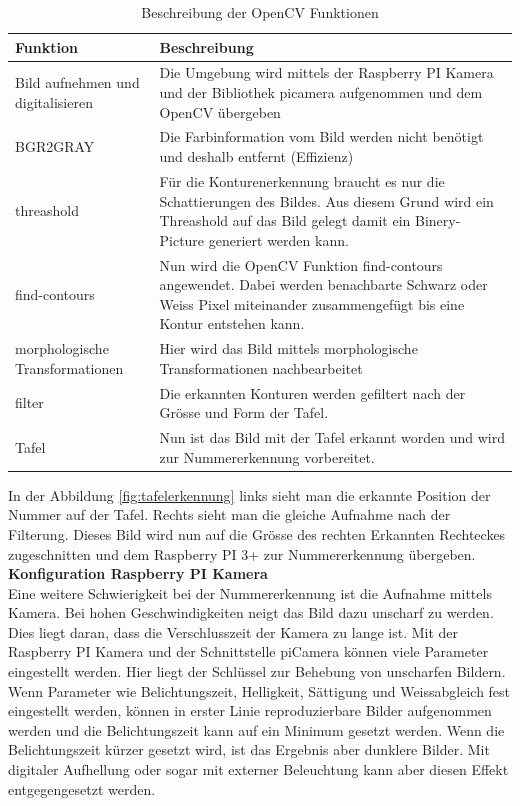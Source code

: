 \documentclass[../../main.tex]{subfiles}
\begin{document}
    \begin{table}[H]
        \begin{flushleft}
            \begin{tabular}{ | p{3cm} | p{10.5cm} |}
                \hline
                \textbf{Funktion}  & \textbf{Beschreibung} \\\hline
                Bild aufnehmen und digitalisieren & Die Umgebung wird mittels der Raspberry PI Kamera und der Bibliothek picamera aufgenommen und dem OpenCV übergeben \\\hline
                BGR2GRAY & Die Farbinformation vom Bild werden nicht benötigt und deshalb entfernt (Effizienz) \\ \hline
                threashold & Für die Konturenerkennung braucht es nur die Schattierungen des Bildes. Aus diesem Grund wird ein Threashold auf das Bild gelegt damit ein Binery- Picture generiert werden kann. \\ \hline
                find-contours & Nun wird die OpenCV Funktion find-contours angewendet. Dabei werden benachbarte Schwarz oder Weiss Pixel miteinander zusammengefügt bis eine Kontur entstehen kann. \\ \hline
                morphologische Transformationen & Hier wird das Bild mittels morphologische Transformationen nachbearbeitet \\ \hline
                filter & Die erkannten Konturen werden gefiltert nach der Grösse und Form der Tafel. \\ \hline
                Tafel & Nun ist das Bild mit der Tafel erkannt worden und wird zur Nummererkennung vorbereitet. \\ \hline
            \end{tabular}
        \end{flushleft}
        \caption{Beschreibung der OpenCV Funktionen}
        \label{tab:OpenCV_Funktionen_Tafelerkennung}
     \end{table}

     In der Abbildung \ref{fig:tafelerkennung} links sieht man die erkannte Position der Nummer auf der Tafel. Rechts sieht man die gleiche Aufnahme nach der Filterung. Dieses Bild wird nun auf die Grösse des rechten Erkannten Rechteckes zugeschnitten und dem Raspberry PI 3+ zur Nummererkennung übergeben.\\

     \textbf{Konfiguration Raspberry PI Kamera}\\
     Eine weitere Schwierigkeit bei der Nummererkennung ist die Aufnahme mittels Kamera. Bei hohen Geschwindigkeiten neigt das Bild dazu unscharf zu werden. Dies liegt daran, dass die Verschlusszeit der Kamera zu lange ist. Mit der Raspberry PI Kamera und der Schnittstelle piCamera können viele Parameter eingestellt werden. Hier liegt der Schlüssel zur Behebung von unscharfen Bildern. Wenn Parameter wie Belichtungszeit, Helligkeit, Sättigung und Weissabgleich fest eingestellt werden, können in erster Linie reproduzierbare Bilder aufgenommen werden und die Belichtungszeit kann auf ein Minimum gesetzt werden. Wenn die Belichtungszeit kürzer gesetzt wird, ist das Ergebnis aber dunklere Bilder. Mit digitaler Aufhellung oder sogar mit externer Beleuchtung kann aber diesen Effekt entgegengesetzt werden.
\end{document}
